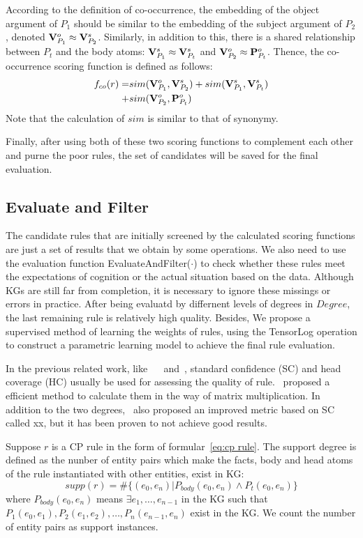 \documentclass{article}
\begin{document}
	According to the definition of co-occurrence, the embedding of the object argument of $P_1$ should be similar to the embedding of the subject argument of $P_2$, denoted ${\bf V}^o_{P_1} \approx {\bf V}^s_{P_2}$.
	Similarly, in addition to this, there is a shared relationship between $P_t$ and the body atoms: ${\bf V}^s_{P_1} \approx {\bf V}^s_{P_t}$ and ${\bf V}^o_{P_2} \approx {\bf P}^o_{P_t}$. Thence, the co-occurrence scoring function is defined as follows:
	\begin{align}
	f_{co}(r) = &sim({\bf V}^o_{P_1}, {\bf V}^s_{P_2}) + sim({\bf V}^s_{P_1}, {\bf V}^s_{P_t}) \nonumber\\
	 +& sim({\bf V}^o_{P_2}, {\bf P}^o_{P_t}) 
	\end{align}
	Note that the calculation of $sim$ is similar to that of synonymy.
	
	Finally, after using both of these two scoring functions to complement each other and purne the poor rules, the set of candidates will be saved for the final evaluation.
	
	\subsection{Evaluate and Filter}
	The candidate rules that are initially screened by the calculated scoring functions are just a set of results that we obtain by some operations. We also need to use the evaluation function \textsf{EvaluateAndFilter($\cdot$) }to check whether these rules meet the expectations of cognition or the actual situation based on the data. Although KGs are still far from completion, it is necessary to ignore these missings or errors in practice. After being evaluatd by differnent levels of degrees in $Degree$, the last remaining rule is relatively high quality.
	Besides, We propose a supervised method of learning the weights of rules, using the TensorLog operation to construct a parametric learning model to achieve the final rule evaluation.

	In the previous related work, like~\cite{Chen:ScaLeKB} ~\cite{Galarraga:AMIE+} and~\cite{Omran:RLvLR}, standard confidence (SC) and head coverage (HC) usually be used for assessing the quality of rule.~\cite{Omran:RLvLR} proposed a efficient method to calculate them in the way of matrix multiplication.
	In addition to the two degrees,~\cite{Galarraga:AMIE+} also proposed an improved metric based on SC called xx, but it has been proven to not achieve good results.
	
	Suppose $r$ is a CP rule in the form of formular~\ref{eq:cp rule}. The support degree is defined as the nunber of entity pairs which make the  facts, body and head atoms of the rule instantiated with other entities, exist in KG:
	\begin{equation}
		supp(r) = \#\{(e_0, e_n) | P_{body}(e_0, e_n) \land P_t(e_0, e_n)\} \nonumber
	\end{equation}
	where $P_{body}(e_0, e_n)$ means $\exists e_1, \dots, e_{n-1}$ in the KG such that $P_1(e_0, e_1), P_2(e_1, e_2), \dots, P_n(e_{n-1}, e_n)$ exist in the KG. We count the number of entity pairs as support instances.
	
\end{document}
